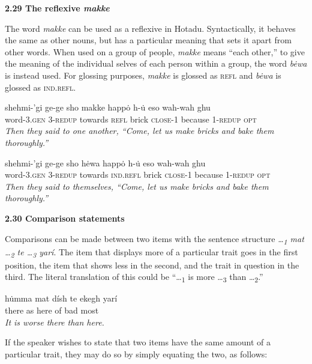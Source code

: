 \documentclass{article}[10pt]
\begin{document}
{\bf 2.29 The reflexive \emph{makke}}

The word \emph{makke} can be used as a reflexive in Hotadu. Syntactically, it behaves the same as other nouns, but has a particular meaning that sets it apart from other words. When used on a group of people, \emph{makke} means ``each other,'' to give the meaning of the individual selves of each person within a group, the word \emph{b\.{e}wa} is instead used. For glossing purposes, \emph{makke} is glossed as \textsc{refl} and \emph{b\.{e}wa} is glossed as \textsc{ind.refl}.

\begin{exe}
\ex
\gll shehmi-'gi ge-ge sho makke happ\.{o} h-\.{u} eso wah-wah ghu\\
word-\textsc{3.gen} 3-\textsc{redup} towards \textsc{refl} brick \textsc{close}-1 because 1-\textsc{redup} \textsc{opt}\\
\trans \emph{Then they said to one another, ``Come, let us make bricks and bake them thoroughly.''}

\ex
\gll shehmi-'gi ge-ge sho h\.{e}wa happ\.{o} h-\.{u} eso wah-wah ghu\\
word-\textsc{3.gen} 3-\textsc{redup} towards \textsc{ind.refl} brick \textsc{close}-1 because 1-\textsc{redup} \textsc{opt}\\
\trans \emph{Then they said to themselves, ``Come, let us make bricks and bake them thoroughly.''}
\end{exe}

{\bf 2.30 Comparison statements}

Comparisons can be made between two items with the sentence structure \emph{\ldots\textsubscript{1} mat \ldots\textsubscript{2} te \ldots\textsubscript{3} yar\'{i}}. The item that displays more of a particular trait goes in the first position, the item that shows less in the second, and the trait in question in the third. The literal translation of this could be ``\ldots\textsubscript{1} is more \ldots\textsubscript{3} than \ldots\textsubscript{2}.''

\begin{exe}
\ex
\gll h\.{u}mma mat d\'{i}sh te ekegh yar\'{i}\\
there as here of bad most\\
\trans \emph{It is worse there than here.}
\end{exe}

If the speaker wishes to state that two items have the same amount of a particular trait, they may do so by simply equating the two, as follows:
\end{document}
